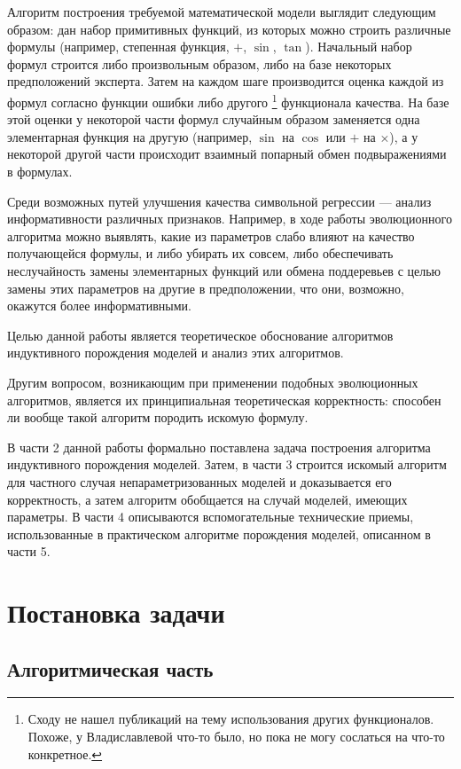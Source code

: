 \documentclass[12pt,a4paper]{amsart}
\begin{document}
Алгоритм построения требуемой математической модели выглядит следующим образом:
дан набор примитивных функций, из которых можно строить различные формулы
(например, степенная функция, $+$, $\sin$, $\tan$). Начальный набор формул
строится либо произвольным образом, либо на базе некоторых предположений
эксперта. Затем на каждом шаге производится оценка каждой из формул согласно
функции ошибки либо другого \footnote{Сходу не нашел публикаций на тему
использования других функционалов. Похоже, у Владиславлевой что-то было, но
пока не могу сослаться на что-то конкретное.} функционала качества. На базе
этой оценки у некоторой части формул случайным образом заменяется одна элементарная
функция на другую (например, $\sin$ на $\cos$ или $+$ на $\times$), а у некоторой
другой части происходит взаимный попарный обмен подвыражениями в формулах.

Среди возможных путей улучшения качества символьной регрессии --- анализ
информативности различных признаков. Например, в ходе работы эволюционного
алгоритма можно выявлять, какие из параметров слабо влияют на качество
получающейся формулы, и либо убирать их совсем, либо обеспечивать
неслучайность замены элементарных функций или обмена поддеревьев с целью
замены этих параметров на другие в предположении, что они, возможно,
окажутся более информативными.

Целью данной работы является теоретическое обоснование алгоритмов индуктивного
порождения моделей и анализ этих алгоритмов.

Другим вопросом, возникающим при применении подобных эволюционных алгоритмов,
является их принципиальная теоретическая корректность: способен ли вообще
такой алгоритм породить искомую формулу.

В части 2 данной работы формально поставлена задача построения алгоритма
индуктивного порождения моделей. Затем, в части 3 строится искомый алгоритм
для частного случая непараметризованных моделей и доказывается его корректность,
а затем алгоритм обобщается на случай моделей, имеющих параметры. В части 4
описываются вспомогательные технические приемы, использованные в практическом
алгоритме порождения моделей, описанном в части 5.

\section{Постановка задачи}

\subsection{Алгоритмическая часть}
\end{document}

